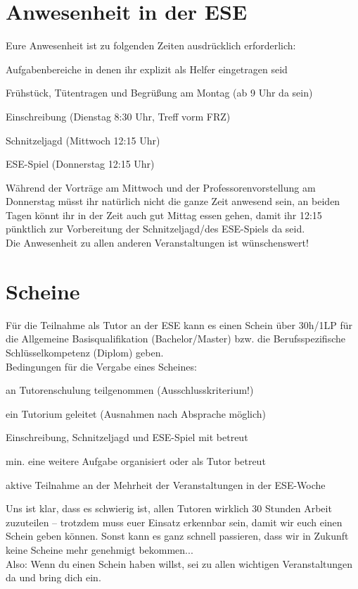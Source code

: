 \documentclass[a4paper,12pt]{report}
\begin{document}
\section{Anwesenheit in der ESE}
Eure Anwesenheit ist zu folgenden Zeiten ausdrücklich erforderlich:
\begin{itemize*}
	\item Aufgabenbereiche in denen ihr explizit als Helfer eingetragen seid
	\item Frühstück, Tütentragen und Begrüßung am Montag (ab 9 Uhr da sein)
	\item Einschreibung (Dienstag 8:30 Uhr, Treff vorm FRZ)
	\item Schnitzeljagd (Mittwoch 12:15 Uhr)
	\item ESE-Spiel (Donnerstag 12:15 Uhr)
\end{itemize*}
Während der Vorträge am Mittwoch und der Professorenvorstellung am Donnerstag müsst ihr natürlich nicht die ganze Zeit anwesend sein, an beiden Tagen könnt ihr in der Zeit auch gut Mittag essen gehen, damit ihr 12:15 pünktlich zur Vorbereitung der Schnitzeljagd/des ESE-Spiels da seid.\\
Die Anwesenheit zu allen anderen Veranstaltungen ist wünschenswert!

\section{Scheine}
Für die Teilnahme als Tutor an der ESE kann es einen Schein über 30h/1LP für die Allgemeine Basisqualifikation (Bachelor/Master) bzw. die Berufsspezifische Schlüsselkompetenz (Diplom) geben.\\
Bedingungen für die Vergabe eines Scheines:
\begin{itemize*}
	\item an Tutorenschulung teilgenommen (Ausschlusskriterium!)
	\item ein Tutorium geleitet (Ausnahmen nach Absprache möglich)
	\item Einschreibung, Schnitzeljagd und ESE-Spiel mit betreut
	\item min. eine weitere Aufgabe organisiert oder als Tutor betreut
	\item aktive Teilnahme an der Mehrheit der Veranstaltungen in der ESE-Woche
\end{itemize*}
Uns ist klar, dass es schwierig ist, allen Tutoren wirklich 30 Stunden Arbeit zuzuteilen -- trotzdem muss euer Einsatz erkennbar sein, damit wir euch einen Schein geben können. Sonst kann es ganz schnell passieren, dass wir in Zukunft keine Scheine mehr genehmigt bekommen...\\
Also: Wenn du einen Schein haben willst, sei zu allen wichtigen Veranstaltungen da und bring dich ein.
\end{document}
